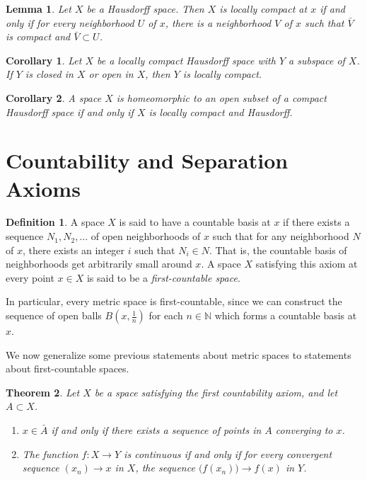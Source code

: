\documentclass{article}
\newtheorem{theorem}{Theorem}[section]
\newtheorem{lemma}[theorem]{Lemma}
\newtheorem{corollary}{Corollary}[theorem]
\theoremstyle{remark}
\theoremstyle{definition}
\newtheorem{definition}{Definition}[section]
\begin{document}
\begin{lemma}
Let $X$ be a Hausdorff space. Then $X$ is locally compact at $x$ if and only if for every neighborhood $U$ of $x$, there is a neighborhood $V$ of $x$ such that $\bar{V}$ is compact and $\bar{V} \subset U$. 
\end{lemma}

\begin{corollary}
Let $X$ be a locally compact Hausdorff space with $Y$ a subspace of $X$. If $Y$ is closed in $X$ or open in $X$, then $Y$ is locally compact. 
\end{corollary}

\begin{corollary}
A space $X$ is homeomorphic to an open subset of a compact Hausdorff space if and only if $X$ is locally compact and Hausdorff. 
\end{corollary}

\section{Countability and Separation Axioms}
\begin{definition}
A space $X$ is said to have a countable basis at $x$ if there exists a sequence $N_1, N_2, ...$ of open neighborhoods of $x$ such that for any neighborhood $N$ of $x$, there exists an integer $i$ such that $N_i \in N$. That is, the countable basis of neighborhoods get arbitrarily small around $x$. A space $X$ satisfying this axiom at every point $x \in X$ is said to be a \textit{first-countable space}. 
\end{definition}

In particular, every metric space is first-countable, since we can construct the sequence of open balls $B (x, \frac{1}{n})$ for each $n \in \mathbb{N}$ which forms a countable basis at $x$. 

We now generalize some previous statements about metric spaces to statements about first-countable spaces. 

\begin{theorem}
Let $X$ be a space satisfying the first countability axiom, and let $A \subset X$. 
\begin{enumerate}
    \item $x \in \bar{A}$ if and only if there exists a sequence of points in $A$ converging to $x$. 
    \item The function $f: X \longrightarrow Y$ is continuous if and only if for every convergent sequence $(x_n) \rightarrow x$ in $X$, the sequence $\big( f(x_n)\big) \rightarrow f(x)$ in $Y$. 
\end{enumerate}
\end{theorem}
\end{document}
